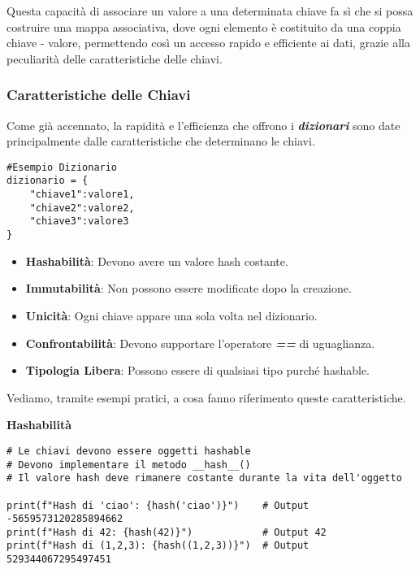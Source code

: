 Questa capacità di associare un valore a una determinata chiave fa sì che si possa costruire una mappa associativa, dove ogni elemento è costituito da una coppia chiave - valore, permettendo così un accesso rapido e efficiente ai dati, grazie alla peculiarità delle caratteristiche delle chiavi.

\subsubsection{Caratteristiche delle Chiavi}\label{CaratteristicheChiaviDict}
Come già accennato, la rapidità e l'efficienza che offrono i \textit{\textbf{dizionari}} sono date principalmente dalle caratteristiche che determinano le chiavi.


\begin{lstlisting}
#Esempio Dizionario
dizionario = {
    "chiave1":valore1,
    "chiave2":valore2,
    "chiave3":valore3
}
\end{lstlisting}


\vspace{0.5cm}
\begin{tcolorbox}[colback=blue!5!white,colframe=blue!75!black,title=Caratteristiche principali delle Chiavi]
\begin{itemize}
    \item \textbf{Hashabilità}: Devono avere un valore hash costante.
    
    \item \textbf{Immutabilità}: Non possono essere modificate dopo la creazione.
    
    \item \textbf{Unicità}: Ogni chiave appare una sola volta nel dizionario.
    
    \item \textbf{Confrontabilità}: Devono supportare l'operatore \textit{\textbf{==}} di uguaglianza.
    
    \item \textbf{Tipologia Libera}: Possono essere di qualsiasi tipo purché hashable.
    
\end{itemize}
\end{tcolorbox}


Vediamo, tramite esempi pratici, a cosa fanno riferimento queste caratteristiche.
\vspace{0.5cm}

\textbf{Hashabilità}
\begin{lstlisting}
# Le chiavi devono essere oggetti hashable
# Devono implementare il metodo __hash__()
# Il valore hash deve rimanere costante durante la vita dell'oggetto

print(f"Hash di 'ciao': {hash('ciao')}")    # Output -5659573120285894662
print(f"Hash di 42: {hash(42)}")            # Output 42
print(f"Hash di (1,2,3): {hash((1,2,3))}")  # Output 529344067295497451
\end{lstlisting}

